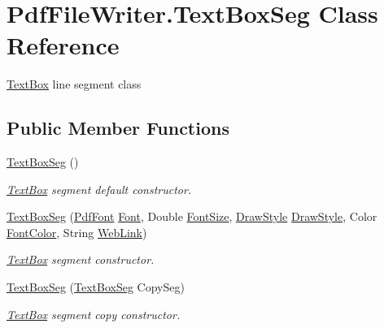 \hypertarget{class_pdf_file_writer_1_1_text_box_seg}{}\section{Pdf\+File\+Writer.\+Text\+Box\+Seg Class Reference}
\label{class_pdf_file_writer_1_1_text_box_seg}


\hyperlink{class_pdf_file_writer_1_1_text_box}{Text\+Box} line segment class  


\subsection*{Public Member Functions}
\begin{DoxyCompactItemize}
\item 
\hyperlink{class_pdf_file_writer_1_1_text_box_seg_ae0bec50bf277f2a389770a83e8108109}{Text\+Box\+Seg} ()
\begin{DoxyCompactList}\small\item\em \hyperlink{class_pdf_file_writer_1_1_text_box}{Text\+Box} segment default constructor. \end{DoxyCompactList}\item 
\hyperlink{class_pdf_file_writer_1_1_text_box_seg_a12ae5dfec3a242858b55645d74a5a39a}{Text\+Box\+Seg} (\hyperlink{class_pdf_file_writer_1_1_pdf_font}{Pdf\+Font} \hyperlink{class_pdf_file_writer_1_1_text_box_seg_a84d800defbedc85809b43aa5e61f5021}{Font}, Double \hyperlink{class_pdf_file_writer_1_1_text_box_seg_a3f47de35ffa9a9788e5c32ca18d2029a}{Font\+Size}, \hyperlink{namespace_pdf_file_writer_a2bcdd73c6cedab15d6f6c2a64333ef39}{Draw\+Style} \hyperlink{namespace_pdf_file_writer_a2bcdd73c6cedab15d6f6c2a64333ef39}{Draw\+Style}, Color \hyperlink{class_pdf_file_writer_1_1_text_box_seg_abfc443282401e8293c4046f0e89008cf}{Font\+Color}, String \hyperlink{class_pdf_file_writer_1_1_text_box_seg_ab5cbd106a7fa8a82e7bf5af77b961881}{Web\+Link})
\begin{DoxyCompactList}\small\item\em \hyperlink{class_pdf_file_writer_1_1_text_box}{Text\+Box} segment constructor. \end{DoxyCompactList}\item 
\hyperlink{class_pdf_file_writer_1_1_text_box_seg_a5ee10d863fd0d930142add19e6f4d410}{Text\+Box\+Seg} (\hyperlink{class_pdf_file_writer_1_1_text_box_seg}{Text\+Box\+Seg} Copy\+Seg)
\begin{DoxyCompactList}\small\item\em \hyperlink{class_pdf_file_writer_1_1_text_box}{Text\+Box} segment copy constructor. \end{DoxyCompactList}\item 

\end{DoxyCompactItemize}
